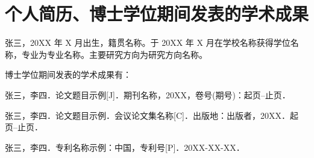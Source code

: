 \chapter*{个人简历、博士学位期间发表的学术成果}

\begingroup
\songti
\fontsize{12bp}{20bp}\selectfont
\setlength{\parindent}{2em}
\setlength{\parskip}{0pt}
\justifying

张三，20XX 年 X 月出生，籍贯名称。于 20XX 年 X 月在学校名称获得学位名称，专业为专业名称。主要研究方向为研究方向名称。

博士学位期间发表的学术成果有：

\begin{enumerate}[
  label={[\arabic*]},
  leftmargin=4em,
  labelwidth=2em,
  labelsep=0.5em,
  align=left,
  itemindent=0pt,
  listparindent=0pt,
  itemsep=0pt,
  parsep=0pt,
  topsep=0pt,
  partopsep=0pt
]
\item 张三，李四．论文题目示例[J]．期刊名称，20XX，卷号(期号)：起页--止页．
\item 张三，李四．论文题目示例．会议论文集名称[C]．出版地：出版者，20XX．起页--止页．
\item 张三，李四．专利名称示例：中国，专利号[P]．20XX-XX-XX．
\end{enumerate}
\endgroup
